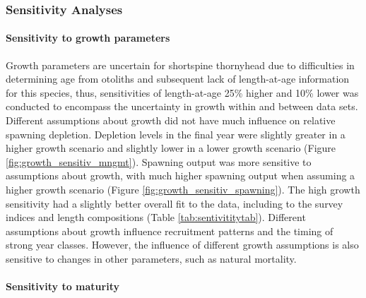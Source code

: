 \documentclass[11pt,
  letterpaper,
]{article}
\begin{document}
\hypertarget{sensitivity-analyses}{%
\subsubsection{Sensitivity Analyses}\label{sensitivity-analyses}}

\hypertarget{sensitivity-to-growth-parameters}{%
\paragraph{Sensitivity to growth parameters}\label{sensitivity-to-growth-parameters}}

Growth parameters are uncertain for shortspine thornyhead due to difficulties in determining age from otoliths and subsequent lack of length-at-age information for this species, thus, sensitivities of length-at-age 25\% higher and 10\% lower was conducted to encompass the uncertainty in growth within and between data sets. Different assumptions about growth did not have much influence on relative spawning depletion. Depletion levels in the final year were slightly greater in a higher growth scenario and slightly lower in a lower growth scenario (Figure \ref{fig:growth_sensitiv_mngmt}). Spawning output was more sensitive to assumptions about growth, with much higher spawning output when assuming a higher growth scenario (Figure \ref{fig:growth_sensitiv_spawning}). The high growth sensitivity had a slightly better overall fit to the data, including to the survey indices and length compositions (Table \ref{tab:sentivititytab}). Different assumptions about growth influence recruitment patterns and the timing of strong year classes. However, the influence of different growth assumptions is also sensitive to changes in other parameters, such as natural mortality.

\hypertarget{sensitivity-to-maturity}{%
\paragraph{Sensitivity to maturity}\label{sensitivity-to-maturity}}
\end{document}
